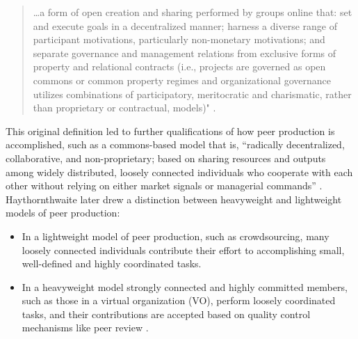 \documentclass[thesis,tocnosub,noragright,centerchapter,12pt]{uiucecethesis09}
\begin{document}
\begin{quote}
\ldots{}a form of open creation and sharing performed by groups online
that: set and execute goals in a decentralized manner; harness a diverse
range of participant motivations, particularly non-monetary motivations;
and separate governance and management relations from exclusive forms of
property and relational contracts (i.e., projects are governed as open
commons or common property regimes and organizational governance
utilizes combinations of participatory, meritocratic and charismatic,
rather than proprietary or contractual, models)" \citeyearpar{benkler2013peer}.
\end{quote}

This original definition led to further qualifications of how peer production is accomplished, such as a
commons-based model that is, ``radically decentralized, collaborative,
and non-proprietary; based on sharing resources and outputs among widely
distributed, loosely connected individuals who cooperate with each other
without relying on either market signals or managerial commands'' \citep[p. 61]{benkler2006wealth}.\\

Haythornthwaite later drew a distinction between heavyweight and lightweight models of  peer production:

\begin{itemize}
\item
  In a lightweight model of peer production, such as crowdsourcing, many
  loosely connected individuals contribute their effort to accomplishing small,
  well-defined and highly coordinated tasks. 
\item
  In a heavyweight model strongly connected and highly committed
  members, such as those in a virtual organization (VO), perform loosely
  coordinated tasks, and their contributions are accepted based on
  quality control mechanisms like peer review \citeyearpar{haythornthwaite2009crowds}.
\end{itemize}
\end{document}
